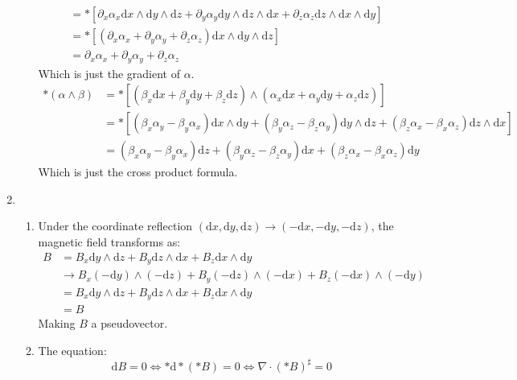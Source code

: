 \documentclass[12pt,a4]{article}
\newcommand{\e}{\mathrm{d}}
\begin{document}
\begin{enumerate}
\begin{enumerate}
\begin{align*}
                      &= *\left[\partial_x \alpha_x \e x \wedge \e y \wedge \e z + \partial_y \alpha_y \e y \wedge \e z \wedge \e x + \partial_z \alpha_z \e z \wedge \e x \wedge \e y\right]\\
                      &= *\left[(\partial_x \alpha_x + \partial_y \alpha_y + \partial_z \alpha_z ) \e x \wedge \e y \wedge \e z\right]\\
                      &= \partial_x \alpha_x + \partial_y \alpha_y + \partial_z \alpha_z
        \end{align*}
        Which is just the gradient of $\alpha$.
        \begin{align*}
          * (\alpha \wedge \beta)
                      &= *\left[(\beta_x \e x + \beta_y \e y + \beta_z \e z) \wedge (\alpha_x \e x + \alpha_y \e y + \alpha_z \e z)\right]\\
                      &= *\left[(\beta_x\alpha_y - \beta_y\alpha_x) \e x \wedge \e y + (\beta_y \alpha_z - \beta_z \alpha_y)\e y \wedge \e z + (\beta_z \alpha_x - \beta_x \alpha_z)\e z \wedge \e x \right]\\
                      &= (\beta_x\alpha_y - \beta_y\alpha_x) \e z + (\beta_y \alpha_z - \beta_z \alpha_y)\e x + (\beta_z \alpha_x - \beta_x \alpha_z)\e y
        \end{align*}
        Which is just the cross product formula.
    \end{enumerate}
  \item
    \begin{enumerate}
      \item
        Under the coordinate reflection $(\e x, \e y, \e z) \to (- \e x, -\e y, -\e z)$, the magnetic field transforms as:
        \begin{align*}
          B &= B_x \e y \wedge \e z + B_y \e z \wedge \e x + B_z \e x \wedge \e y \\
            &\to  B_x (- \e y) \wedge ( - \e z) + B_y (-\e z) \wedge (- \e x) + B_z (- \e x) \wedge (-\e y)\\
            &=  B_x \e y \wedge \e z + B_y \e z \wedge \e x + B_z \e x \wedge \e y\\
            &=  B
        \end{align*}
        Making $B$ a pseudovector.
      \item
        The equation:
        \begin{equation*}
          \e B = 0 \Leftrightarrow * \e * (*B) = 0 \Leftrightarrow \nabla \cdot (* B)^\sharp = 0
        \end{equation*}

\end{enumerate}
\end{enumerate}
\end{document}
